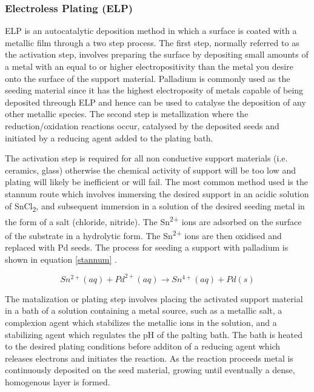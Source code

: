 \subsubsection*{Electroless Plating (ELP)}\label{ELPREV}
ELP is an autocatalytic deposition method in which a surface is coated with a metallic film through a two step process. The first step, normally referred to as the activation step, involves preparing the surface by depositing small amounts of a metal with an equal to or higher electropositivity than the metal you desire onto the surface of the support material. Palladium is commonly used as the seeding material since it has the highest electroposity of metals capable of being deposited threough ELP and hence can be used to catalyse the deposition of any other metallic species. \cite{Exter2015}
The second step is metallization where the reduction/oxidation reactions occur, catalysed by the deposited seeds and initiated by a reducing agent added to the plating bath.

The activation step is required for all non conductive support materials (i.e. ceramics, glass) otherwise the chemical activity of support will be too low and plating will likely be inefficient or will fail. The most common method used is the stannum route which involves immersing the desired support in an acidic solution of SnCl\textsubscript{2}, and subsequent immersion in a solution of the desired seeding metal in the form of a salt (chloride, nitride). The Sn\textsuperscript{2+} ions are adsorbed on the surface of the substrate in a hydrolytic form. The Sn\textsuperscript{2+} ions are then oxidised and replaced with Pd seeds. \cite{Exter2015} The process for seeding a support with palladium is shown in equation \ref{stannum} \cite{Exter2015}.

\begin{equation} \label{stannum}
    Sn^{2+} (aq) + Pd^{2+} (aq) \rightarrow Sn^{4+} (aq) + Pd(s)
\end{equation}

The matalization or plating step involves placing the activated support material in a bath of a solution containing a metal source, such as a metallic salt, a complexion agent which stabilizes the metallic ions in the solution, and a stabilizing agent which regulates the pH of the palting bath. The bath is heated to the desired plating conditions before additon of a reducing agent which releases electrons and initiates the reaction. As the reaction proceeds metal is continuously deposited on the seed material, growing until eventually a dense, homogenous layer is formed. 

